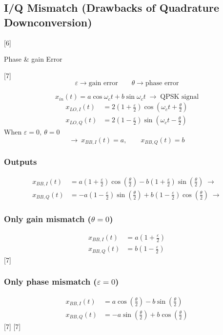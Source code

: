 \documentclass[11pt,a4paper]{article}
\begin{document}
\subsection{I/Q Mismatch (Drawbacks of Quadrature Downconversion)}

[6]

Phase \& gain Error

[7]
\[ \varepsilon \rightarrow \text{gain error} \qquad \theta \rightarrow \text{phase error} \]

\[ x_{in}(t) = a\cos\omega_c t + b\sin\omega_c t \;\rightarrow\; \text{QPSK signal} \]
\begin{align*}
x_{LO,I}(t) &= 2\left(1 + \tfrac{\varepsilon}{2}\right)\cos\left(\omega_c t + \tfrac{\theta}{2}\right)\\
x_{LO,Q}(t) &= 2\left(1 - \tfrac{\varepsilon}{2}\right)\sin\left(\omega_c t - \tfrac{\theta}{2}\right)
\end{align*}
When $\varepsilon = 0,\ \theta = 0$
\[ \rightarrow\ x_{BB,I}(t) = a,\qquad x_{BB,Q}(t) = b \]

\subsubsection{Outputs}
\begin{align*}
x_{BB,I}(t) &= a\left(1 + \tfrac{\varepsilon}{2}\right)\cos\left(\tfrac{\theta}{2}\right) - b\left(1 + \tfrac{\varepsilon}{2}\right)\sin\left(\tfrac{\theta}{2}\right) \;\longrightarrow\\
x_{BB,Q}(t) &= -a\left(1 - \tfrac{\varepsilon}{2}\right)\sin\left(\tfrac{\theta}{2}\right) + b\left(1 - \tfrac{\varepsilon}{2}\right)\cos\left(\tfrac{\theta}{2}\right) \;\longrightarrow
\end{align*}

\subsubsection{Only gain mismatch ($\theta = 0$)}
\begin{align*}
x_{BB,I}(t) &= a\left(1 + \tfrac{\varepsilon}{2}\right)\\
x_{BB,Q}(t) &= b\left(1 - \tfrac{\varepsilon}{2}\right)
\end{align*}
[7]

\subsubsection{Only phase mismatch ($\varepsilon = 0$)}
\begin{align*}
x_{BB,I}(t) &= a\cos\left(\tfrac{\theta}{2}\right) - b\sin\left(\tfrac{\theta}{2}\right)\\
x_{BB,Q}(t) &= -a\sin\left(\tfrac{\theta}{2}\right) + b\cos\left(\tfrac{\theta}{2}\right)
\end{align*}
[7]
[7]
\end{document}
